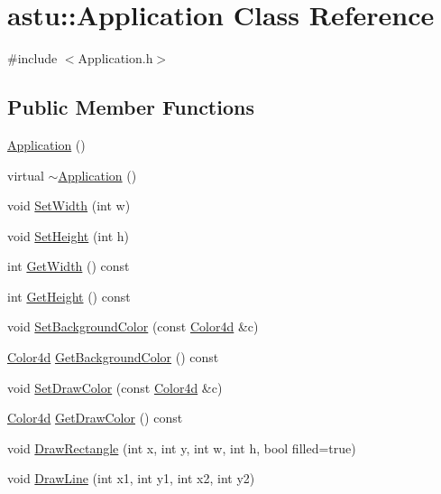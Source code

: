 \hypertarget{classastu_1_1Application}{}\section{astu\+:\+:Application Class Reference}
\label{classastu_1_1Application}


{\ttfamily \#include $<$Application.\+h$>$}

\subsection*{Public Member Functions}
\begin{DoxyCompactItemize}
\item 
\hyperlink{classastu_1_1Application_a8fd6025d4412ece9dc752a4a988f833f}{Application} ()
\item 
virtual \hyperlink{classastu_1_1Application_a9f165c3c8eba9eb7e09949aab426d653}{$\sim$\+Application} ()
\item 
void \hyperlink{classastu_1_1Application_a6d991cdd5263dd9d1a08218c84e70a24}{Set\+Width} (int w)
\item 
void \hyperlink{classastu_1_1Application_a192e4c7ccec81846119762f30aceaf12}{Set\+Height} (int h)
\item 
int \hyperlink{classastu_1_1Application_af6f316ed892f9bf487d49d5ba1309e3f}{Get\+Width} () const
\item 
int \hyperlink{classastu_1_1Application_aacee0ec39dbde4c506987abe4be99099}{Get\+Height} () const
\item 
void \hyperlink{classastu_1_1Application_ab1563999702c9d6ae6e707c4cd2c80c6}{Set\+Background\+Color} (const \hyperlink{classastu_1_1Color}{Color4d} \&c)
\item 
\hyperlink{classastu_1_1Color}{Color4d} \hyperlink{classastu_1_1Application_ab033ca3bac5e8423638c118e5f92c62b}{Get\+Background\+Color} () const
\item 
void \hyperlink{classastu_1_1Application_aa311d33c9784e7326a9633336176fe05}{Set\+Draw\+Color} (const \hyperlink{classastu_1_1Color}{Color4d} \&c)
\item 
\hyperlink{classastu_1_1Color}{Color4d} \hyperlink{classastu_1_1Application_a0b019c1dc5797d4ee5e604ed5cd831ed}{Get\+Draw\+Color} () const
\item 
void \hyperlink{classastu_1_1Application_afd2e771d8bfd2b1a55e11f62c099078a}{Draw\+Rectangle} (int x, int y, int w, int h, bool filled=true)
\item 
void \hyperlink{classastu_1_1Application_ade2136cdf7123cade44d9f8701018878}{Draw\+Line} (int x1, int y1, int x2, int y2)

\end{DoxyCompactItemize}
